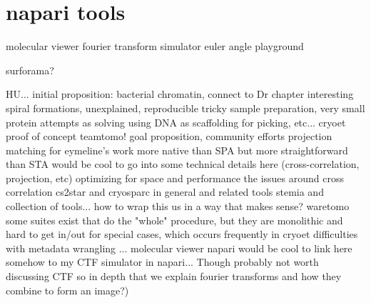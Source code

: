 \section{napari tools}
molecular viewer
fourier transform simulator
euler angle playground

surforama?


\begin{outline}
\1 HU...
    \2 initial proposition: bacterial chromatin, connect to Dr chapter
    \2 interesting spiral formations, unexplained, reproducible
    \2 tricky sample preparation, very small protein
        \3 attempts as solving using DNA as scaffolding for picking, etc...
        \3 cryoet proof of concept
\1 teamtomo!
    \2 goal proposition, community efforts
\1 projection matching for eymeline's work
    \2 more native than SPA but more straightforward than STA
    \2 would be cool to go into some technical details here (cross-correlation, projection, etc)
    \2 optimizing for space and performance
    \2 the issues around cross correlation
\1 cs2star and cryosparc in general and related tools
\1 stemia and collection of tools... how to wrap this us in a way that makes sense?
\1 waretomo
    \2 some suites exist that do the "whole" procedure, but they are monolithic and hard to get in/out for special cases, which occurs frequently in cryoet
    \2 difficulties with metadata wrangling
    \2 ...
\1 molecular viewer napari
\1 would be cool to link here somehow to my CTF simulator in napari... Though probably not worth discussing CTF so in depth that we explain fourier transforms and how they combine to form an image?)
\end{outline}

